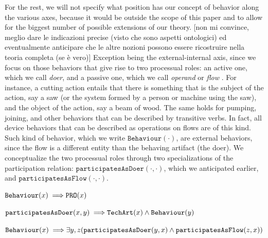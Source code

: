\documentclass[sw]{iosart2x}
\newcommand{\bflist}{\begin{list}{}{\setlength{\topsep}{2mm}\setlength{\partopsep}{0mm}\setlength{\parsep}{0mm}\setlength{\leftmargin}{9mm}\setlength{\labelwidth}{8mm}}}
\newcommand{\eflist}{\end{list}}
\newcommand{\AxLabel}{\textrm{a}}
\newcounter{cntax}
\newcommand{\myax}[1]{\refstepcounter{cntax}\begin{small}{\bf \AxLabel\thecntax\label{ax:#1}}\end{small}}
\newcommand{\generalStyle}[1]{\texttt{#1}}
\newcommand{\biRel}[3]{\generalStyle{#1}(#2,#3)}
\newcommand{\uniRel}[2]{\generalStyle{#1}(#2)}
\newcommand{\myfi}{\hspace{0.9mm} \Longrightarrow}
\newcommand{\DOLCEProcess}[1]{\uniRel{PRO}{#1}}
\newcommand{\TechArt}[1]{\uniRel{TechArt}{#1}}
\newcommand{\BehaviourConcrete}[1]{\uniRel{Behaviour}{#1}}
\newcommand{\participateAsDoer}[2]{\biRel{participatesAsDoer}{#1}{#2}}
\newcommand{\participateAsFlow}[2]{\biRel{participatesAsFlow}{#1}{#2}}
\newcommand{\firstTimeKeyWord}[1]{\textit{#1}}
\newcommand{\TODO}[1]{{\color{red} #1}}
\begin{document}
For the rest, we will not specify what position has our concept of behavior along the various axes, because it would be outside the scope of this paper and to allow for the biggest number of possible extensions of our theory.\TODO{[non mi convince, meglio dare le indicazioni precise (visto che sono aspetti ontologici) ed eventualmente anticipare che le altre nozioni possono essere ricostruire nella teoria completa (se è vero)]} 
Exception being the external-internal axis, since we focus on those behaviors that give rise to two processual roles: an active one, which we call \firstTimeKeyWord{doer}, and a passive one, which we call \firstTimeKeyWord{operand} or \firstTimeKeyWord{flow} \cite{pahl_engineering_2007}. 
For instance, a cutting action entails that there is something that is the subject of the action, say a saw (or the system formed by a person or machine using the saw), and the object of the action, say a beam of wood.
The same holds for pumping, joining, and other behaviors that can be described by transitive verbs. 
In fact, all device behaviors that can be described as operations on flows are of this kind. 
Such kind of behavior, which we write $\BehaviourConcrete{\cdot}$, are external behaviors, since the flow is a different entity than the behaving artifact (the doer).
We conceptualize the two processual roles through two specializations of the participation relation: $\participateAsDoer{\cdot}{\cdot}$, which we anticipated earlier, and $\participateAsFlow{\cdot}{\cdot}$. 
\bflist
  \item[\myax{behaviorSubsum}] $ \BehaviourConcrete{x} \myfi \DOLCEProcess{x} $
  \item[\myax{participateAsDoerRage}]  $ \participateAsDoer{x}{y} \myfi \TechArt{x} \land \BehaviourConcrete{y} $
  \item[\myax{processualRoles}] $ \BehaviourConcrete{x} \myfi \exists y,z(\participateAsDoer{y}{x} \land \participateAsFlow{z}{x}) $ 
\eflist
\end{document}
